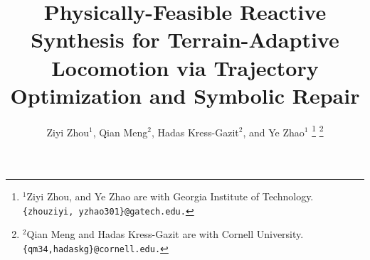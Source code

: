 \documentclass[letterpaper, 10 pt, conference]{ieeeconf}
\begin{document}
\newcommand{\vg}[1]{\bm{#1}}
\renewcommand{\v}[1]{\mathbf{#1}}

\title{\LARGE \bf Physically-Feasible Reactive Synthesis for Terrain-Adaptive Locomotion via Trajectory Optimization and Symbolic Repair\\
}

\author{
\large Ziyi Zhou$^{1}$,
Qian Meng$^{2}$, 
Hadas Kress-Gazit$^{2}$, and
Ye Zhao$^{1}$
\thanks{$^{1}$Ziyi Zhou, and Ye Zhao are with Georgia Institute of Technology. {\tt\small \{zhouziyi, yzhao301\}@gatech.edu.}}
\thanks{$^{2}$Qian Meng and Hadas Kress-Gazit are with Cornell University. {\tt\small \{qm34,hadaskg\}@cornell.edu.}}
}
\maketitle
\end{document}
